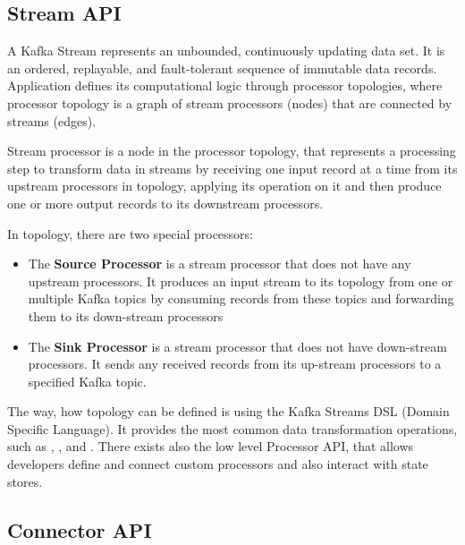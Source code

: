 


\subsection{Stream API \label{frameworks:kafka:streams}}

A Kafka Stream represents an unbounded, continuously updating data set.
It is an ordered, replayable, and fault-tolerant sequence of immutable data records.
Application defines its computational logic through processor topologies,
where processor topology is a graph of stream processors (nodes) that are
connected by streams (edges).

Stream processor is a node in the processor topology, that represents
a processing step to transform data in streams by receiving one
input record at a time from its upstream processors in topology,
applying its operation on it and then produce one or more
output records to its downstream processors.

In topology, there are two special processors:

\begin{itemize}
  \item The \textbf{Source Processor} is a stream processor
    that does not have any upstream processors. It produces an input stream
    to its topology from one or multiple Kafka topics by consuming records
    from these topics and forwarding them to its down-stream processors
  \item The \textbf{Sink Processor} is a stream processor
    that does not have down-stream processors. It sends any received records
    from its up-stream processors to a specified Kafka topic.
\end{itemize}

The way, how topology can be defined is using the Kafka Streams DSL (Domain Specific Language).
It provides the most common data transformation operations, such as
, ,  and .
There exists also the low level Processor API, that allows developers define
and connect custom processors and also interact with state stores.




\subsection{Connector API \label{frameworks:kafka:connector}}

